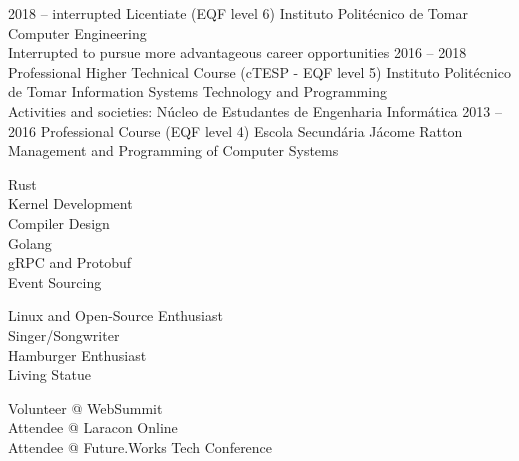 \documentclass[9pt]{developercv} %
\begin{document}

\begin{entrylist}
	\entry
		{2018 -- interrupted}
		{Licentiate (EQF level 6)}
		{Instituto Politécnico de Tomar}
		{Computer Engineering\\Interrupted to pursue more advantageous career opportunities}
        \entry
		{2016 -- 2018}
		{Professional Higher Technical Course (cTESP - EQF level 5)}
		{Instituto Politécnico de Tomar}
		{Information Systems Technology and Programming\\Activities and societies: Núcleo de Estudantes de Engenharia Informática}
	\entry
		{2013 -- 2016}
		{Professional Course (EQF level 4)}
		{Escola Secundária Jácome Ratton}
		{Management and Programming of Computer Systems}
\end{entrylist}


\begin{minipage}[t]{0.2\textwidth}
	\vspace{-\baselineskip} %
	

        Rust\\
        Kernel Development\\
        Compiler Design\\
        Golang\\
        gRPC and Protobuf\\
        Event Sourcing
\end{minipage}
\hfill
\begin{minipage}[t]{0.3\textwidth}
	\vspace{-\baselineskip} %
	
	
        Linux and Open-Source Enthusiast\\	
        Singer/Songwriter\\
        Hamburger Enthusiast\\
        Living Statue
\end{minipage}
\hfill
\begin{minipage}[t]{0.4\textwidth}
	\vspace{-\baselineskip} %
	
	
	Volunteer @ WebSummit\\
        Attendee @ Laracon Online\\
        Attendee @ Future.Works Tech Conference
\end{minipage}

\end{document}
